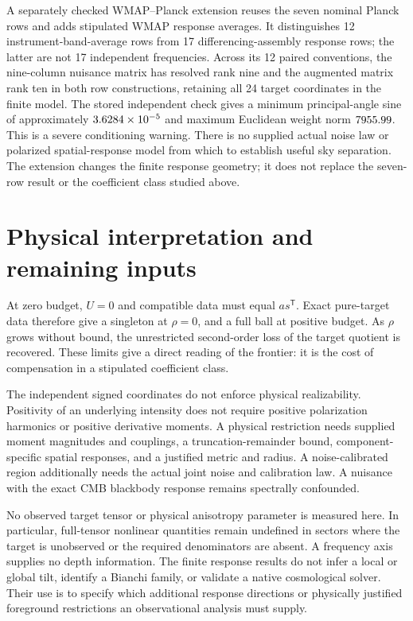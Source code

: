 \documentclass[aps,prd,onecolumn,11pt,nofootinbib,notitlepage]{revtex4-2}
\begin{document}
A separately checked WMAP--Planck extension reuses the seven nominal Planck rows and adds stipulated WMAP response averages. It distinguishes 12 instrument-band-average rows from 17 differencing-assembly response rows; the latter are not 17 independent frequencies. Across its 12 paired conventions, the nine-column nuisance matrix has resolved rank nine and the augmented matrix rank ten in both row constructions, retaining all 24 target coordinates in the finite model. The stored independent check gives a minimum principal-angle sine of approximately $3.6284\times10^{-5}$ and maximum Euclidean weight norm $7955.99$. This is a severe conditioning warning. There is no supplied actual noise law or polarized spatial-response model from which to establish useful sky separation. The extension changes the finite response geometry; it does not replace the seven-row result or the coefficient class studied above.

\section{Physical interpretation and remaining inputs}

At zero budget, $U=0$ and compatible data must equal $as^{\mathsf T}$. Exact pure-target data therefore give a singleton at $\rho=0$, and a full ball at positive budget. As $\rho$ grows without bound, the unrestricted second-order loss of the target quotient is recovered. These limits give a direct reading of the frontier: it is the cost of compensation in a stipulated coefficient class.

The independent signed coordinates do not enforce physical realizability. Positivity of an underlying intensity does not require positive polarization harmonics or positive derivative moments. A physical restriction needs supplied moment magnitudes and couplings, a truncation-remainder bound, component-specific spatial responses, and a justified metric and radius. A noise-calibrated region additionally needs the actual joint noise and calibration law. A nuisance with the exact CMB blackbody response remains spectrally confounded.

No observed target tensor or physical anisotropy parameter is measured here. In particular, full-tensor nonlinear quantities remain undefined in sectors where the target is unobserved or the required denominators are absent. A frequency axis supplies no depth information. The finite response results do not infer a local or global tilt, identify a Bianchi family, or validate a native cosmological solver. Their use is to specify which additional response directions or physically justified foreground restrictions an observational analysis must supply.
\end{document}
